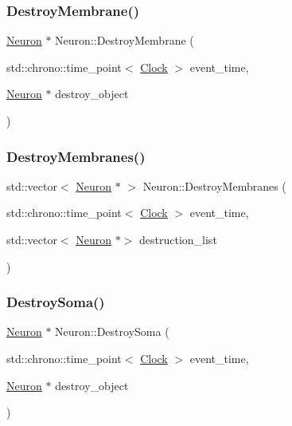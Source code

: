 \mbox{\label{classNeuron_a127d1b915e976c63e731a94b7d27e0b1}} 
\subsubsection{\texorpdfstring{Destroy\+Membrane()}{DestroyMembrane()}}
{\footnotesize\ttfamily \mbox{\hyperlink{classNeuron}{Neuron}} $\ast$ Neuron\+::\+Destroy\+Membrane (\begin{DoxyParamCaption}\item[{std\+::chrono\+::time\+\_\+point$<$ \mbox{\hyperlink{universe_8h_a0ef8d951d1ca5ab3cfaf7ab4c7a6fd80}{Clock}} $>$}]{event\+\_\+time,  }\item[{\mbox{\hyperlink{classNeuron}{Neuron}} $\ast$}]{destroy\+\_\+object }\end{DoxyParamCaption})}

\mbox{\label{classNeuron_ab77feff95ed7127400a4e02648641ff7}} 
\subsubsection{\texorpdfstring{Destroy\+Membranes()}{DestroyMembranes()}}
{\footnotesize\ttfamily std\+::vector$<$ \mbox{\hyperlink{classNeuron}{Neuron}} $\ast$ $>$ Neuron\+::\+Destroy\+Membranes (\begin{DoxyParamCaption}\item[{std\+::chrono\+::time\+\_\+point$<$ \mbox{\hyperlink{universe_8h_a0ef8d951d1ca5ab3cfaf7ab4c7a6fd80}{Clock}} $>$}]{event\+\_\+time,  }\item[{std\+::vector$<$ \mbox{\hyperlink{classNeuron}{Neuron}} $\ast$$>$}]{destruction\+\_\+list }\end{DoxyParamCaption})}

\mbox{\label{classNeuron_a6ff7510f73e29c31003b016bdcb4a70e}} 
\subsubsection{\texorpdfstring{Destroy\+Soma()}{DestroySoma()}}
{\footnotesize\ttfamily \mbox{\hyperlink{classNeuron}{Neuron}} $\ast$ Neuron\+::\+Destroy\+Soma (\begin{DoxyParamCaption}\item[{std\+::chrono\+::time\+\_\+point$<$ \mbox{\hyperlink{universe_8h_a0ef8d951d1ca5ab3cfaf7ab4c7a6fd80}{Clock}} $>$}]{event\+\_\+time,  }\item[{\mbox{\hyperlink{classNeuron}{Neuron}} $\ast$}]{destroy\+\_\+object }\end{DoxyParamCaption})}

